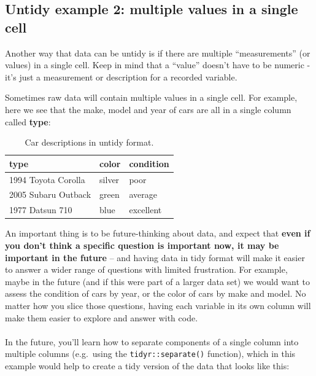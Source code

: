 \documentclass[
]{book}
\begin{document}
\hypertarget{untidy-example-2-multiple-values-in-a-single-cell}{%
\subsection{Untidy example 2: multiple values in a single cell}\label{untidy-example-2-multiple-values-in-a-single-cell}}

Another way that data can be untidy is if there are multiple ``measurements'' (or values) in a single cell. Keep in mind that a ``value'' doesn't have to be numeric - it's just a measurement or description for a recorded variable.

Sometimes raw data will contain multiple values in a single cell. For example, here we see that the make, model and year of cars are all in a single column called \textbf{type}:

\begin{table}

\caption{\label{tab:unnamed-chunk-4}Car descriptions in untidy format.}
\centering
\begin{tabular}[t]{l|l|l}
\hline
type & color & condition\\
\hline
1994 Toyota Corolla & silver & poor\\
\hline
2005 Subaru Outback & green & average\\
\hline
1977 Datsun 710 & blue & excellent\\
\hline
\end{tabular}
\end{table}

An important thing is to be future-thinking about data, and expect that \textbf{even if you don't think a specific question is important now, it may be important in the future} -- and having data in tidy format will make it easier to answer a wider range of questions with limited frustration. For example, maybe in the future (and if this were part of a larger data set) we would want to assess the condition of cars by year, or the color of cars by make and model. No matter how you slice those questions, having each variable in its own column will make them easier to explore and answer with code.\\
~\\
In the future, you'll learn how to separate components of a single column into multiple columns (e.g.~using the \texttt{tidyr::separate()} function), which in this example would help to create a tidy version of the data that looks like this:\\
\end{document}
